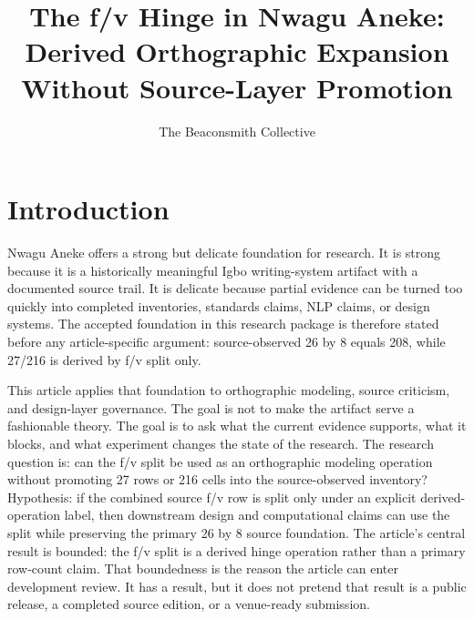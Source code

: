 \documentclass[sigconf,nonacm]{acmart}
\title{The f/v Hinge in Nwagu Aneke: Derived Orthographic Expansion Without Source-Layer Promotion}
\author{The Beaconsmith Collective}
\affiliation{\institution{Etisiobi Research Studio}\city{Enugu}\country{Nigeria}}
\begin{document}
\maketitle

\section{Introduction}
Nwagu Aneke offers a strong but delicate foundation for research. It is strong
because it is a historically meaningful Igbo writing-system artifact with a
documented source trail. It is delicate because partial evidence can be turned
too quickly into completed inventories, standards claims, NLP claims, or design
systems. The accepted foundation in this research package is therefore stated
before any article-specific argument: source-observed 26 by 8 equals 208, while
27/216 is derived by f/v split only.

This article applies that foundation to orthographic modeling, source criticism, and design-layer governance. The goal is not to make the
artifact serve a fashionable theory. The goal is to ask what the current
evidence supports, what it blocks, and what experiment changes the state of the
research. The research question is: can the f/v split be used as an
orthographic modeling operation without promoting 27 rows or 216 cells into the
source-observed inventory? Hypothesis: if the combined source f/v row is split
only under an explicit derived-operation label, then downstream design and
computational claims can use the split while preserving the primary 26 by 8
source foundation. The article's central result is bounded: the f/v split is a
derived hinge operation rather than a primary row-count claim. That boundedness
is the reason the article can enter development review. It has a result, but it
does not pretend that result is a public release, a completed source edition, or
a venue-ready submission.
\end{document}
